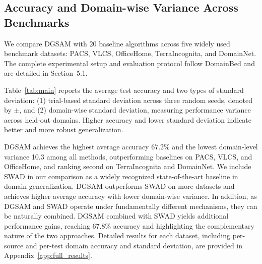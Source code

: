 \documentclass{article}
\theoremstyle{plain}
\theoremstyle{definition}
\theoremstyle{remark}
\begin{document}
\subsection{Accuracy and Domain-wise Variance Across Benchmarks}\label{sec:exp_main}

We compare DGSAM with 20 baseline algorithms across five widely used benchmark datasets: PACS, VLCS, OfficeHome, TerraIncognita, and DomainNet. The complete experimental setup and evaluation protocol follow DomainBed \citep{gulrajani2021domainbed} and are detailed in Section~5.1.

Table~\ref{tab:main} reports the average test accuracy and two types of standard deviation: (1) trial-based standard deviation across three random seeds, denoted by \(\pm\), and (2) domain-wise standard deviation, measuring performance variance across held-out domains. Higher accuracy and lower standard deviation indicate better and more robust generalization.

DGSAM achieves the highest average accuracy 67.2\% and the lowest domain-level variance 10.3 among all methods, outperforming baselines on PACS, VLCS, and OfficeHome, and ranking second on TerraIncognita and DomainNet. We include SWAD in our comparison as a widely recognized state-of-the-art baseline in domain generalization. DGSAM outperforms SWAD on more datasets and achieves higher average accuracy with lower domain-wise variance. In addition, as DGSAM and SWAD operate under fundamentally different mechanisms, they can be naturally combined. DGSAM combined with SWAD yields additional performance gains, reaching 67.8\% accuracy and highlighting the complementary nature of the two approaches. Detailed results for each dataset, including per-source and per-test domain accuracy and standard deviation, are provided in Appendix~\ref{app:full_results}.





\end{document}
